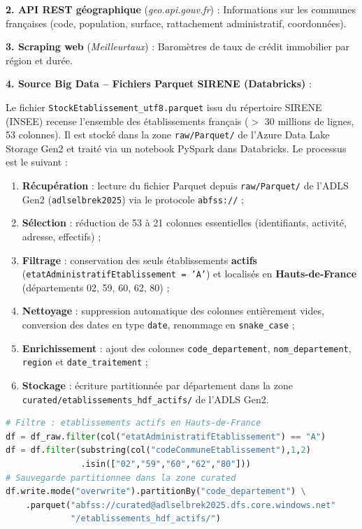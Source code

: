 \documentclass[12pt,a4paper]{article}
\begin{document}
\textbf{2. API REST géographique} (\textit{geo.api.gouv.fr}) : Informations sur les communes françaises (code, population, surface, rattachement administratif, coordonnées).

\textbf{3. Scraping web} (\textit{Meilleurtaux}) : Baromètres de taux de crédit immobilier par région et durée.

\textbf{4. Source Big Data -- Fichiers Parquet SIRENE (Databricks)} :

Le fichier \texttt{StockEtablissement\_utf8.parquet} issu du répertoire SIRENE (INSEE) recense l'ensemble des établissements français ($>$ 30 millions de lignes, 53 colonnes). Il est stocké dans la zone \texttt{raw/Parquet/} de l'Azure Data Lake Storage Gen2 et traité via un notebook PySpark dans Databricks. Le processus est le suivant :

\begin{enumerate}
    \item \textbf{Récupération} : lecture du fichier Parquet depuis \texttt{raw/Parquet/} de l'ADLS Gen2 (\texttt{adlselbrek2025}) via le protocole \texttt{abfss://} ;
    \item \textbf{Sélection} : réduction de 53 à 21 colonnes essentielles (identifiants, activité, adresse, effectifs) ;
    \item \textbf{Filtrage} : conservation des seuls établissements \textbf{actifs} (\texttt{etatAdministratifEtablissement = 'A'}) et localisés en \textbf{Hauts-de-France} (départements 02, 59, 60, 62, 80) ;
    \item \textbf{Nettoyage} : suppression automatique des colonnes entièrement vides, conversion des dates en type \texttt{date}, renommage en \texttt{snake\_case} ;
    \item \textbf{Enrichissement} : ajout des colonnes \texttt{code\_departement}, \texttt{nom\_departement}, \texttt{region} et \texttt{date\_traitement} ;
    \item \textbf{Stockage} : écriture partitionnée par département dans la zone \texttt{curated/etablissements\_hdf\_actifs/} de l'ADLS Gen2.
\end{enumerate}

\begin{lstlisting}[language=Python, caption=Extrait -- Filtrage et sauvegarde SIRENE (code complet en Annexe~B.4)]
# Filtre : etablissements actifs en Hauts-de-France
df = df_raw.filter(col("etatAdministratifEtablissement") == "A")
df = df.filter(substring(col("codeCommuneEtablissement"),1,2)
               .isin(["02","59","60","62","80"]))
# Sauvegarde partitionnee dans la zone curated
df.write.mode("overwrite").partitionBy("code_departement") \
    .parquet("abfss://curated@adlselbrek2025.dfs.core.windows.net"
             "/etablissements_hdf_actifs/")
\end{lstlisting}
\end{document}
